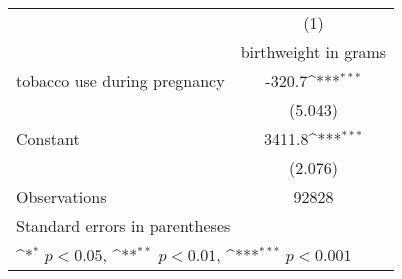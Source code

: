 {
\def\sym#1{\ifmmode^{#1}\else\(^{#1}\)\fi}
\begin{tabular}{l*{1}{c}}
\hline\hline
                    &\multicolumn{1}{c}{(1)}\\
                    &\multicolumn{1}{c}{birthweight in grams}\\
\hline
tobacco use during pregnancy&      -320.7\sym{***}\\
                    &     (5.043)         \\
[1em]
Constant            &      3411.8\sym{***}\\
                    &     (2.076)         \\
\hline
Observations        &       92828         \\
\hline\hline
\multicolumn{2}{l}{\footnotesize Standard errors in parentheses}\\
\multicolumn{2}{l}{\footnotesize \sym{*} \(p<0.05\), \sym{**} \(p<0.01\), \sym{***} \(p<0.001\)}\\
\end{tabular}
}
